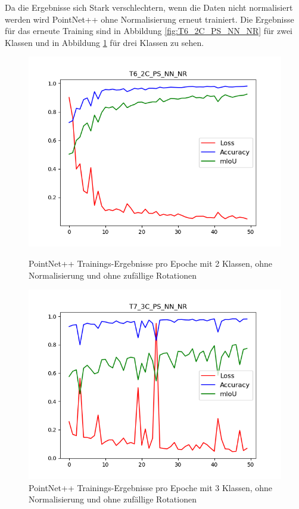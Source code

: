 \documentclass[12pt,titlepage, twoside]{article}
\begin{document}
Da die Ergebnisse sich Stark verschlechtern, wenn die Daten nicht normalisiert werden wird PointNet++ ohne Normalisierung erneut trainiert. 
Die Ergebnisse für das erneute Training sind in Abbildung \ref{fig:T6_2C_PS_NN_NR} für zwei Klassen und in Abbildung \ref{fig:T7_3C_PS_NN_NR} für drei Klassen zu sehen.

\begin{figure}
    \centering
    \begin{minipage}{0.475\textwidth}
        \centering
        \includegraphics[width=1.0\textwidth]{./Images/T6_2C_PS_NN_NR.png}
        \caption{PointNet++ Trainings-Ergebnisse pro Epoche mit 2 Klassen, ohne Normalisierung und ohne zufällige Rotationen }
        \label{fig:T6_2C_PS_NN_NR}
    \end{minipage}\hfill
    \begin{minipage}{0.475\textwidth}
        \centering
        \includegraphics[width=1.0\textwidth]{./Images/T7_3C_PS_NN_NR.png}
        \caption{PointNet++ Trainings-Ergebnisse pro Epoche mit 3 Klassen, ohne Normalisierung und ohne zufällige Rotationen}
        \label{fig:T7_3C_PS_NN_NR}
    \end{minipage}
\end{figure}
\end{document}
